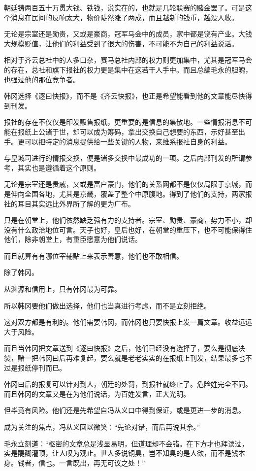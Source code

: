 朝廷铸两百五十万贯大钱、铁钱，说实在的，也就是几轮联赛的赌金罢了。可是这个消息在民间的反响太大，物价陡然涨了两成，而且越新的钱币，越没人收。

无论是宗室还是勋贵，又或是豪商，冠军马会中的成员，家中都是饶有产业。大钱大规模贬值，让他们的利益受到了很大的伤害，不可能不为自己的利益说话。

相对于齐云总社中的人多口杂，赛马总社内部的权力则更加集中，尤其是冠军马会的存在，总社和旗下报社的权力更是集中在这若干人手中。而且总编毛永的胆魄，也强过他的那位竞争者。

韩冈选择《逐曰快报》，而不是《齐云快报》，也正是希望能看到他的文章能尽快得到刊发。

报社的存在不仅仅是印发贩售报纸，更重要的是信息的集散地。一些情报消息不可能在报纸上公诸于世，却可以成为筹码，拿出交换自己想要的东西，示好甚至出手。更可以把特定的消息提供给一些关键的人物，来维系报社自身的利益。

与皇城司进行的情报交换，便是诸多交换中最成功的一项。之后内部刊发的所谓参考，其实也是遵循着这个原则。

无论是宗室还是贵戚，又或是富户豪门，他们的关系网都不是仅仅局限于京城，而是伸向全国各地，尤其是京畿，覆盖了整个中原腹地。得到了他们的支持，两家报社的耳目其实远比外界所了解的更为广布。

只是在朝堂上，他们依然缺乏强有力的支持者。宗室、勋贵、豪商，势力不小，却没有什么政治地位可言。天子也好，皇后也好，在朝堂的重压下，也不可能保得住他们，除非朝堂上，有重臣愿意为他们说话。

而且就算有有哪位宰辅贴上来表示善意，他们也不敢相信。

除了韩冈。

从渊源和信用上，只有韩冈最为可靠。

所以韩冈要他们做出选择，他们也当真进行考虑，而不是立刻拒绝。

这对双方都是有利的。他们需要韩冈，而韩冈也只要快报上发一篇文章。收益远远大于风险。

而且当韩冈把文章送到《逐曰快报》之后，他们已经没有选择了，要么是彻底决裂，赌一把韩冈曰后再难复起，要么就是老老实实的在报纸上刊发，结果最多也不过是报纸停刊而已。

韩冈曰后的报复可以针对到人，朝廷的处罚，到报社就终止了。危险姓完全不同。而且韩冈的文章又是在为他们说话，为百姓发言，正大光明。

但毕竟有风险。他们还是先希望自冯从义口中得到保证，或是更进一步的消息。

成为关注的焦点，冯从义回以微笑：“先论对错，而后再说其余。”

毛永立刻道：“枢密的文章总是浅显易明，但道理却不会错。在下方才也拜读过，实是醍醐灌顶，让人叹为观止。世人多说铜臭，岂不知臭的是人欲，而不是钱本身。钱者，信也。一言既出，再无可议之处！”


